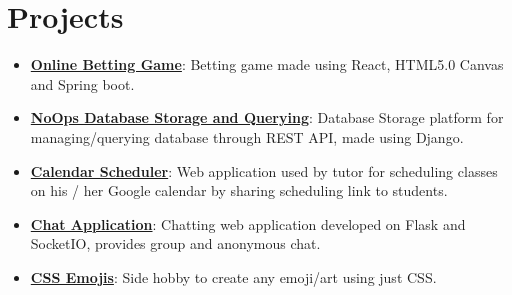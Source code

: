 \documentclass[letterpaper,11pt]{article}
\newcommand{\resumeItem}[2]{
  \item\small{
    \textbf{#1}{: #2 \vspace{-2pt}}
  }
}
\newcommand{\resumeSubItem}[2]{\resumeItem{#1}{#2}\vspace{-4pt}}
\newcommand{\resumeSubHeadingListStart}{\begin{itemize}[leftmargin=*]}
\newcommand{\resumeSubHeadingListEnd}{\end{itemize}}
\begin{document}
\section{Projects}
  \resumeSubHeadingListStart
    \resumeSubItem{\href{https://bettinza.herokuapp.com/}{Online Betting Game}}
      {Betting game made using React, HTML5.0 Canvas and Spring boot.}
    \resumeSubItem{\href{https://yazlo.herokuapp.com/}{NoOps Database Storage and Querying}}
      {Database Storage platform for managing/querying database through REST API, made using Django.}
    \resumeSubItem{\href{https://tutoschedule.herokuapp.com/}{Calendar Scheduler}}
      {Web application used by tutor for scheduling classes on his / her Google calendar by sharing scheduling link to students.}
    \resumeSubItem{\href{https://flasksocketiochat.herokuapp.com/}{Chat Application}}
      {Chatting web application developed on Flask and SocketIO, provides group and anonymous chat.}
    \resumeSubItem{\href{https://codepen.io/bony2023/}{CSS Emojis}}
      {Side hobby to create any emoji/art using just CSS.}
  \resumeSubHeadingListEnd


\end{document}
